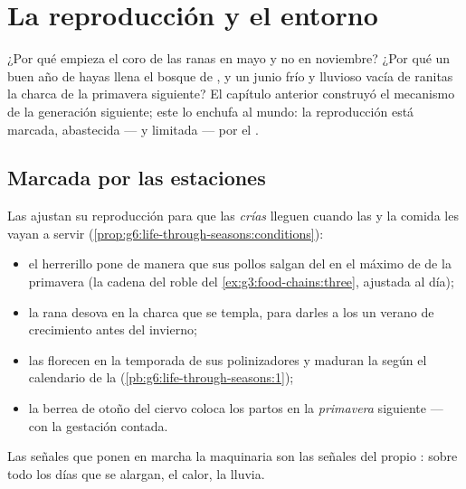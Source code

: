 \chapter{La reproducción y el entorno}\label{ch:g8:reproduction-and-environment}

¿Por qué empieza el coro de las ranas en mayo y no en noviembre? ¿Por
qué un buen año de hayas llena el bosque de , y un junio frío
y lluvioso vacía de ranitas la charca de la primavera siguiente? El
capítulo anterior construyó el mecanismo de la generación siguiente;
este lo enchufa al mundo: la reproducción está marcada, abastecida ---
y limitada --- por el .

\section{Marcada por las estaciones}

\begin{proposition}\label{prop:g8:reproduction-and-environment:timing}
Las  ajustan su reproducción para que las \emph{crías} lleguen
cuando las  y la comida les vayan a servir
(\cref{prop:g6:life-through-seasons:conditions}):
\begin{itemize}
  \item el herrerillo pone de manera que sus pollos salgan del  en
        el máximo de  de la primavera (la cadena del roble del
        \cref{ex:g3:food-chains:three}, ajustada al día);
  \item la rana desova en la charca que se templa, para darles a los
         un verano de crecimiento antes del invierno;
  \item las  florecen en la temporada de sus polinizadores y
        maduran la  según el calendario de la 
        (\cref{pb:g6:life-through-seasons:1});
  \item la berrea de otoño del ciervo coloca los partos en la
        \emph{primavera} siguiente --- con la gestación contada.
\end{itemize}
Las señales que ponen en marcha la maquinaria son las señales del
propio : sobre todo los días que se alargan, el calor, la lluvia.
\end{proposition}
\admitted

